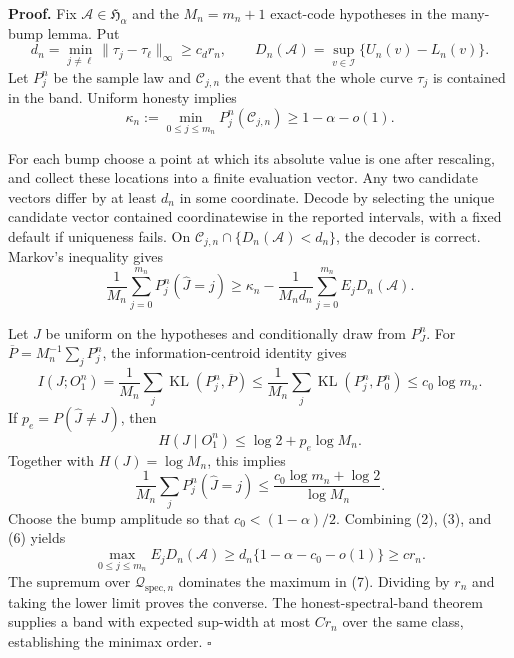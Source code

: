 \textbf{Proof.}
Fix \(\mathcal A\in\mathfrak H_\alpha\) and the \(M_n=m_n+1\) exact-code hypotheses in the many-bump lemma. Put
\[
 d_n=\min_{j\ne\ell}\|\tau_j-\tau_\ell\|_\infty\ge c_dr_n,\qquad
 D_n(\mathcal A)=\sup_{v\in\mathcal I}\{U_n(v)-L_n(v)\}. \tag{1}
\]
Let \(P_j^n\) be the sample law and \(\mathcal C_{j,n}\) the event that the whole curve \(\tau_j\) is contained in the band. Uniform honesty implies
\[
 \kappa_n:=\min_{0\le j\le m_n}P_j^n(\mathcal C_{j,n})
 \ge1-\alpha-o(1). \tag{2}
\]

For each bump choose a point at which its absolute value is one after rescaling, and collect these locations into a finite evaluation vector. Any two candidate vectors differ by at least \(d_n\) in some coordinate. Decode by selecting the unique candidate vector contained coordinatewise in the reported intervals, with a fixed default if uniqueness fails. On \(\mathcal C_{j,n}\cap\{D_n(\mathcal A)<d_n\}\), the decoder is correct. Markov's inequality gives
\[
 \frac1{M_n}\sum_{j=0}^{m_n}P_j^n(\widehat J=j)
 \ge\kappa_n-\frac1{M_nd_n}
 \sum_{j=0}^{m_n}E_jD_n(\mathcal A). \tag{3}
\]

Let \(J\) be uniform on the hypotheses and conditionally draw from \(P_J^n\). For \(\overline P=M_n^{-1}\sum_jP_j^n\), the information-centroid identity gives
\[
 I(J;O_1^n)
 =\frac1{M_n}\sum_j\operatorname{KL}(P_j^n,\overline P)
 \le\frac1{M_n}\sum_j\operatorname{KL}(P_j^n,P_0^n)
 \le c_0\log m_n. \tag{4}
\]
If \(p_e=P(\widehat J\ne J)\), then
\[
 H(J\mid O_1^n)\le\log2+p_e\log M_n. \tag{5}
\]
Together with \(H(J)=\log M_n\), this implies
\[
 \frac1{M_n}\sum_jP_j^n(\widehat J=j)
 \le\frac{c_0\log m_n+\log2}{\log M_n}. \tag{6}
\]
Choose the bump amplitude so that \(c_0<(1-\alpha)/2\). Combining (2), (3), and (6) yields
\[
 \max_{0\le j\le m_n}E_jD_n(\mathcal A)
 \ge d_n\{1-\alpha-c_0-o(1)\}\ge cr_n. \tag{7}
\]
The supremum over \(\mathcal Q_{\mathrm{spec},n}\) dominates the maximum in (7). Dividing by \(r_n\) and taking the lower limit proves the converse. The honest-spectral-band theorem supplies a band with expected sup-width at most \(Cr_n\) over the same class, establishing the minimax order. \(\square\)
